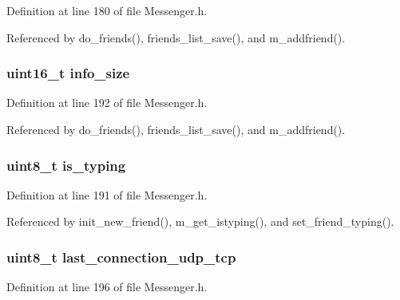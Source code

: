 Definition at line 180 of file Messenger.\+h.



Referenced by do\+\_\+friends(), friends\+\_\+list\+\_\+save(), and m\+\_\+addfriend().

\hypertarget{struct_friend_ac0ae002db55ef8f8366de10ec005b65a}{
\subsubsection[{info\+\_\+size}]{\setlength{\rightskip}{0pt plus 5cm}uint16\+\_\+t info\+\_\+size}}\label{struct_friend_ac0ae002db55ef8f8366de10ec005b65a}


Definition at line 192 of file Messenger.\+h.



Referenced by do\+\_\+friends(), friends\+\_\+list\+\_\+save(), and m\+\_\+addfriend().

\hypertarget{struct_friend_a4eb96aff01799d54246cc48854a47175}{
\subsubsection[{is\+\_\+typing}]{\setlength{\rightskip}{0pt plus 5cm}uint8\+\_\+t is\+\_\+typing}}\label{struct_friend_a4eb96aff01799d54246cc48854a47175}


Definition at line 191 of file Messenger.\+h.



Referenced by init\+\_\+new\+\_\+friend(), m\+\_\+get\+\_\+istyping(), and set\+\_\+friend\+\_\+typing().

\hypertarget{struct_friend_ac213b32e59c2e4a64923c453b100c4e4}{
\subsubsection[{last\+\_\+connection\+\_\+udp\+\_\+tcp}]{\setlength{\rightskip}{0pt plus 5cm}uint8\+\_\+t last\+\_\+connection\+\_\+udp\+\_\+tcp}}\label{struct_friend_ac213b32e59c2e4a64923c453b100c4e4}


Definition at line 196 of file Messenger.\+h.



